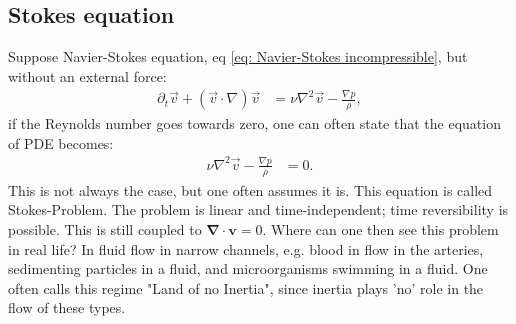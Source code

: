 \documentclass[a4paper]{article}
\newcommand{\dive}[1]{\mathbf{\nabla}\cdot \mathbf{#1}}
\begin{document}
\subsection{Stokes equation}
Suppose Navier-Stokes equation, eq \eqref{eq: Navier-Stokes incompressible}, but without an external force:
\begin{align*}
    \partial_t\vec{v} + \left(\vec{v}\cdot\nabla\right)\vec{v} &= \nu\nabla^2\vec{v} - \frac{\nabla p }{\rho},
\end{align*}if the Reynolds number goes towards zero, one can often state that the equation of PDE becomes:
\begin{align}
    \nu\nabla^2\vec{v} -\frac{\nabla p }{\rho} &= 0.\label{eq: Stokes problem}
\end{align}This is not always the case, but one often assumes it is. This equation is called Stokes-Problem.
The problem is linear and time-independent; time reversibility is possible. This is still coupled to $\dive{v} = 0$.
Where can one then see this problem in real life? In fluid flow in narrow channels, e.g. blood in flow in the arteries, sedimenting particles in a fluid, and microorganisms swimming in a fluid.
One often calls this regime "Land of no Inertia", since inertia plays 'no' role in the flow of these types.
\end{document}
